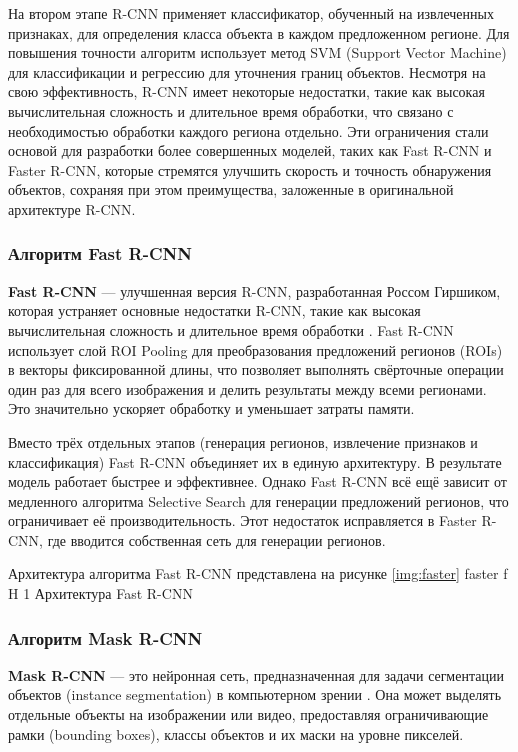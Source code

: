 На втором этапе R-CNN применяет классификатор, обученный на извлеченных признаках, для определения класса объекта в каждом предложенном регионе. Для повышения точности алгоритм использует метод SVM (Support Vector Machine) для классификации и регрессию для уточнения границ объектов. Несмотря на свою эффективность, R-CNN имеет некоторые недостатки, такие как высокая вычислительная сложность и длительное время обработки, что связано с необходимостью обработки каждого региона отдельно. Эти ограничения стали основой для разработки более совершенных моделей, таких как Fast R-CNN и Faster R-CNN, которые стремятся улучшить скорость и точность обнаружения объектов, сохраняя при этом преимущества, заложенные в оригинальной архитектуре R-CNN.
\subsubsection{Алгоритм Fast R-CNN}
\textbf{Fast R-CNN} --- улучшенная версия R-CNN, разработанная Россом Гиршиком, которая устраняет основные недостатки R-CNN, такие как высокая вычислительная сложность и длительное время обработки \cite{fastrcnn}. Fast R-CNN использует слой ROI Pooling для преобразования предложений регионов (ROIs) в векторы фиксированной длины, что позволяет выполнять свёрточные операции один раз для всего изображения и делить результаты между всеми регионами. Это значительно ускоряет обработку и уменьшает затраты памяти.

Вместо трёх отдельных этапов (генерация регионов, извлечение признаков и классификация) Fast R-CNN объединяет их в единую архитектуру. В результате модель работает быстрее и эффективнее. Однако Fast R-CNN всё ещё зависит от медленного алгоритма Selective Search для генерации предложений регионов, что ограничивает её производительность. Этот недостаток исправляется в Faster R-CNN, где вводится собственная сеть для генерации регионов.

Архитектура алгоритма Fast R-CNN представлена на рисунке \ref{img:faster}
	{faster}
	{f}
	{H}
	{1\textwidth}
	{Архитектура Fast R-CNN \cite{fastrcnn}}

\subsubsection{Алгоритм Mask R-CNN}
\textbf{Mask R-CNN} — это нейронная сеть, предназначенная для задачи сегментации объектов (instance segmentation) в компьютерном зрении \cite{maskrcnn}. Она может выделять отдельные объекты на изображении или видео, предоставляя ограничивающие рамки (bounding boxes), классы объектов и их маски на уровне пикселей.

